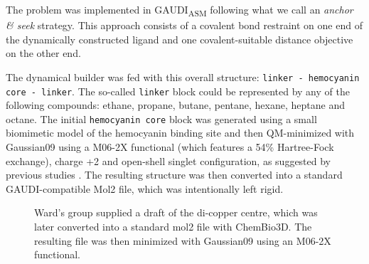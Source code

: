 The problem was implemented in GAUDI\textsubscript{ASM} following what we call an \emph{anchor \& seek} strategy. This approach consists of a covalent bond restraint on one end of the dynamically constructed ligand and one covalent-suitable distance objective on the other end.

The dynamical builder was fed with this overall structure: \texttt{linker - hemocyanin core - linker}. The so-called \texttt{linker} block could be represented by any of the following compounds: ethane, propane, butane, pentane, hexane, heptane and octane. The initial \texttt{hemocyanin core} block was generated using a small biomimetic model of the hemocyanin binding site and then QM-minimized with Gaussian09  using a M06-2X functional (which features a 54\% Hartree-Fock exchange), charge +2 and open-shell singlet configuration, as suggested by previous studies . The resulting structure was then converted into a standard GAUDI-compatible Mol2 file, which was intentionally left rigid.
\begin{figure}
\noindent{}
\caption[Hemocyanin dicopper centre]{Ward's group supplied a draft of the di-copper centre, which was later converted into a standard mol2 file with ChemBio3D. The resulting file was then minimized with Gaussian09 using an M06-2X functional.}
\end{figure}

